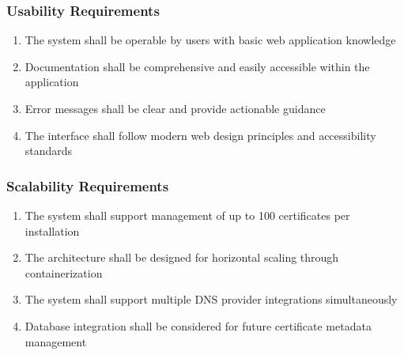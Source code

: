 \subsubsection{Usability Requirements}
\begin{enumerate}
    \item The system shall be operable by users with basic web application knowledge
    \item Documentation shall be comprehensive and easily accessible within the application
    \item Error messages shall be clear and provide actionable guidance
    \item The interface shall follow modern web design principles and accessibility standards
\end{enumerate}

\subsubsection{Scalability Requirements}
\begin{enumerate}
    \item The system shall support management of up to 100 certificates per installation
    \item The architecture shall be designed for horizontal scaling through containerization
    \item The system shall support multiple DNS provider integrations simultaneously
    \item Database integration shall be considered for future certificate metadata management
\end{enumerate}



